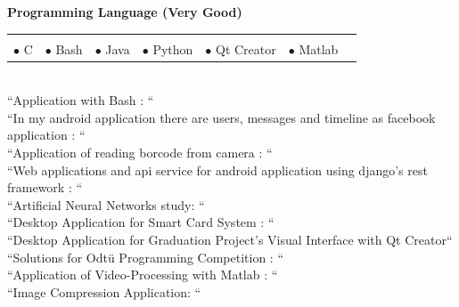 \documentclass[10pt,a4paper]{article}
\begin{document}
{\bf Programming Language (Very Good)}\\
\hspace*{0.3in}\begin{tabular}{lrrrrrr}
\vspace{0.5 mm}\\
  $\bullet$ C &$\bullet$ Bash &$\bullet$ Java &$\bullet$ Python &$\bullet$ Qt Creator &$\bullet$ Matlab\\
\end{tabular}
\vspace{0.5 mm}\\
\hspace*{0.6in}\footnotesize{``Application with Bash : ``}\\
\hspace*{0.6in}\footnotesize{``In my android application there are users, messages and timeline as facebook application : ``}\\
\hspace*{0.6in}\footnotesize{``Application of reading borcode from camera : ``}\\
\hspace*{0.6in}\footnotesize{``Web applications and api service for android application using django’s rest framework : ``}\\
\hspace*{0.6in}\footnotesize{``Artificial Neural Networks study: ``}\\
\hspace*{0.6in}\footnotesize{``Desktop Application for Smart Card System : ``}\\
\hspace*{0.6in}\footnotesize{``Desktop Application for Graduation Project's Visual Interface with Qt Creator``}\\
\hspace*{0.6in}\footnotesize{``Solutions for Odtü Programming Competition : ``}\\
\hspace*{0.6in}\footnotesize{``Application of Video-Processing with Matlab : ``}\\
\hspace*{0.6in}\footnotesize{``Image Compression Application: ``}\\
\end{document}
